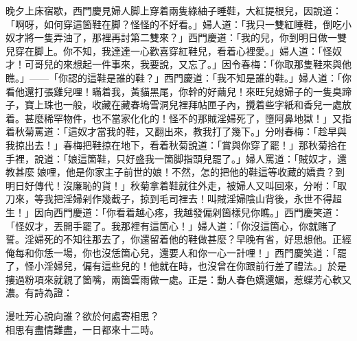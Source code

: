 晚夕上床宿歇，西門慶見婦人脚上穿着兩隻綠紬子睡鞋，大紅提根兒，因說道：「啊呀，如何穿這箇鞋在脚？怪怪的不好看。」婦人道：「我只一雙紅睡鞋，倒吃小奴才將一隻弄油了，那裡再討第二雙來？」西門慶道：「我的兒，你到明日做一雙兒穿在脚上。你不知，我達達一心歡喜穿紅鞋兒，看着心裡愛。」婦人道：「怪奴才！可哥兒的來想起一件事來，我要說，又忘了。」因令春梅：「你取那隻鞋來與他瞧。」——「你認的這鞋是誰的鞋？」西門慶道：「我不知是誰的鞋。」婦人道：「你看他還打張雞兒哩！瞞着我，黃貓黑尾，你幹的好繭兒！來旺兒媳婦子的一隻臭蹄子，寶上珠也一般，收藏在藏春塢雪洞兒裡拜帖匣子內，攪着些字紙和香兒一處放着。甚麼稀罕物件，也不當家化化的！怪不的那賊淫婦死了，墮阿鼻地獄！」{}又指着秋菊罵道：「這奴才當我的鞋，又翻出來，教我打了幾下。」分咐春梅：「趁早與我掠出去！」春梅把鞋掠在地下，看着秋菊說道：「賞與你穿了罷！」那秋菊拾在手裡，說道：「娘這箇鞋，只好盛我一箇脚指頭兒罷了。」婦人罵道：「賊奴才，還教甚麼𣭈娘哩，他是你家主子前世的娘！不然，怎的把他的鞋這等收藏的嬌貴？到明日好傳代！沒廉恥的貨！」秋菊拿着鞋就往外走，被婦人又叫回來，分咐：「取刀來，等我把淫婦剁作幾截子，掠到毛司裡去！叫賊淫婦陰山背後，永世不得超生！」{}因向西門慶道：「你看着越心疼，我越發偏剁箇樣兒你瞧。」西門慶笑道：「怪奴才，丟開手罷了。我那裡有這箇心！」婦人道：「你沒這箇心，你就賭了誓。淫婦死的不知往那去了，你還留着他的鞋做甚麼？早晚有省，好思想他。正經俺每和你恁一場，你也沒恁箇心兒，還要人和你一心一計哩！」{}西門慶笑道：「罷了，怪小淫婦兒，偏有這些兒的！他就在時，也沒曾在你跟前行差了禮法。」於是摟過粉項來就親了箇嘴，兩箇雲雨做一處。正是：動人春色嬌還媚，惹蝶芳心軟又濃。有詩為證：

\begin{myquote}
漫吐芳心說向誰？欲於何處寄相思？\\相思有盡情難盡，一日都來十二時。
\end{myquote}

